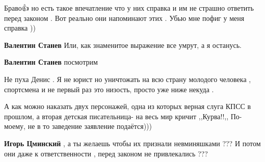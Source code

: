 \begin{itemize}
Браво👍 но есть такое впечатление что у них справка и им не страшно ответить
перед законом . Вот реально они напоминают этих . Убью мне пофиг у меня справка
))

\begin{itemize}
 
\textbf{Валентин Станев} Или, как знаменитое выражение все умрут, а я останусь.


 
\textbf{Валентин Станев} посмотрим

 
Не пуха Денис . Я не юрист но уничтожать на всю страну молодого человека ,
спортсмена и не первый раз это низость, просто уже ниже некуда .
\end{itemize}

 

А как можно наказать двух персонажей, одна из которых верная слуга КПСС в
прошлом, а вторая детская писательница- на весь мир кричит ,,Курва!!,, По-
моему, не в то заведение заявление подаётся)))

\begin{itemize}
 
\textbf{Игорь Цминский} , а ты желаешь чтобы их признали невминяшками ??? И
потом они даже к ответственности , перед законом не привлекались ???


\end{itemize}
\end{itemize}
